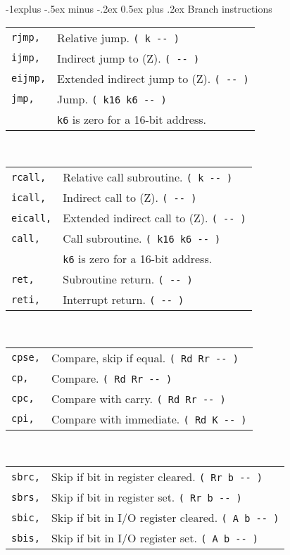 \documentclass[10pt,landscape,a4paper]{article}
\makeatletter
\renewcommand{\subsection}{\@startsection{subsection}{2}{0mm}%
                                {-1explus -.5ex minus -.2ex}%
                                {0.5ex plus .2ex}%
                                {\normalfont\normalsize\bfseries}}
\makeatother
\begin{document}
\begin{multicols}{3}
\subsection{Branch instructions}
\begin{tabular}{@{}ll@{}}
\verb!rjmp,! & Relative jump. \verb!( k -- )! \\
\verb!ijmp,! & Indirect jump to (Z). \verb!( -- )! \\
\verb!eijmp,! & Extended indirect jump to (Z). \verb!( -- )! \\
\verb!jmp,! & Jump. \verb!( k16 k6 -- )! \\
            & \verb!k6! is zero for a 16-bit address. \\
\end{tabular}\\
\begin{tabular}{@{}ll@{}}
\verb!rcall,! & Relative call subroutine. \verb!( k -- )! \\
\verb!icall,! & Indirect call to (Z). \verb!( -- )! \\
\verb!eicall,! & Extended indirect call to (Z). \verb!( -- )! \\
\verb!call,! & Call subroutine. \verb!( k16 k6 -- )! \\
             & \verb!k6! is zero for a 16-bit address. \\
\verb!ret,! & Subroutine return. \verb!( -- )! \\
\verb!reti,! & Interrupt return. \verb!( -- )! \\
\end{tabular}\\
\begin{tabular}{@{}ll@{}}
\verb!cpse,! & Compare, skip if equal. \verb!( Rd Rr -- )! \\
\verb!cp,! & Compare. \verb!( Rd Rr -- )! \\
\verb!cpc,! & Compare with carry. \verb!( Rd Rr -- )! \\
\verb!cpi,! & Compare with immediate. \verb!( Rd K -- )! \\
\end{tabular}\\
\begin{tabular}{@{}ll@{}}
\verb!sbrc,! & Skip if bit in register cleared. \verb!( Rr b -- )! \\
\verb!sbrs,! & Skip if bit in register set. \verb!( Rr b -- )! \\
\verb!sbic,! & Skip if bit in I/O register cleared. \verb!( A b -- )! \\
\verb!sbis,! & Skip if bit in I/O register set. \verb!( A b -- )! \\
\end{tabular}\\


\end{multicols}
\end{document}
